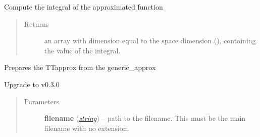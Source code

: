 \documentclass[a4paper,10pt,english]{sphinxmanual}
\begin{document}
\begin{fulllineitems}
\begin{fulllineitems}
\end{fulllineitems}


\begin{fulllineitems}
\label{api-stt:TensorToolbox.core.STT.integrate}
Compute the integral of the approximated function
\begin{quote}\begin{description}
\item[{Returns}] \leavevmode
an array with dimension equal to the space dimension (), containing the value of the integral.

\end{description}\end{quote}

\end{fulllineitems}


\begin{fulllineitems}
\label{api-stt:TensorToolbox.core.STT.prepare_TTapprox}
Prepares the TTapprox from the generic\_approx

\end{fulllineitems}


\begin{fulllineitems}
\label{api-stt:TensorToolbox.core.STT.to_v_0_3_0}
Upgrade to v0.3.0
\begin{quote}\begin{description}
\item[{Parameters}] \leavevmode
\textbf{filename} (\href{http://docs.python.org/library/string.html\#module-string}{\emph{string}}) -- path to the filename. This must be the main filename with no extension.

\end{description}\end{quote}

\end{fulllineitems}


\end{fulllineitems}
\end{document}
